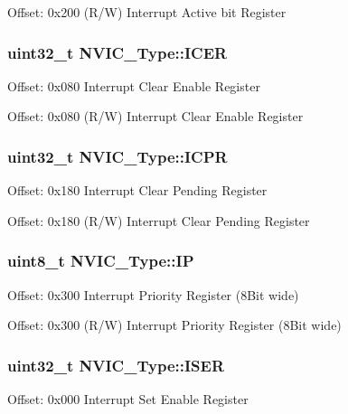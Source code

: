Offset\-: 0x200 (R/\-W) Interrupt Active bit Register \hypertarget{struct_n_v_i_c___type_a2cfb5b93103f658e0521d45bde6f84fd}{
\subsubsection[{I\-C\-E\-R}]{ uint32\-\_\-t N\-V\-I\-C\-\_\-\-Type\-::\-I\-C\-E\-R}}\label{struct_n_v_i_c___type_a2cfb5b93103f658e0521d45bde6f84fd}
Offset\-: 0x080 Interrupt Clear Enable Register

Offset\-: 0x080 (R/\-W) Interrupt Clear Enable Register \hypertarget{struct_n_v_i_c___type_a850acda355b0d6a404feb2be9df69b2d}{
\subsubsection[{I\-C\-P\-R}]{ uint32\-\_\-t N\-V\-I\-C\-\_\-\-Type\-::\-I\-C\-P\-R}}\label{struct_n_v_i_c___type_a850acda355b0d6a404feb2be9df69b2d}
Offset\-: 0x180 Interrupt Clear Pending Register

Offset\-: 0x180 (R/\-W) Interrupt Clear Pending Register \hypertarget{struct_n_v_i_c___type_a3ca7b7ff6aa6094772e524887739bf37}{
\subsubsection[{I\-P}]{ uint8\-\_\-t N\-V\-I\-C\-\_\-\-Type\-::\-I\-P}}\label{struct_n_v_i_c___type_a3ca7b7ff6aa6094772e524887739bf37}
Offset\-: 0x300 Interrupt Priority Register (8\-Bit wide)

Offset\-: 0x300 (R/\-W) Interrupt Priority Register (8\-Bit wide) \hypertarget{struct_n_v_i_c___type_a49017ceff4cda919c8058e9b192bfa08}{
\subsubsection[{I\-S\-E\-R}]{ uint32\-\_\-t N\-V\-I\-C\-\_\-\-Type\-::\-I\-S\-E\-R}}\label{struct_n_v_i_c___type_a49017ceff4cda919c8058e9b192bfa08}
Offset\-: 0x000 Interrupt Set Enable Register

